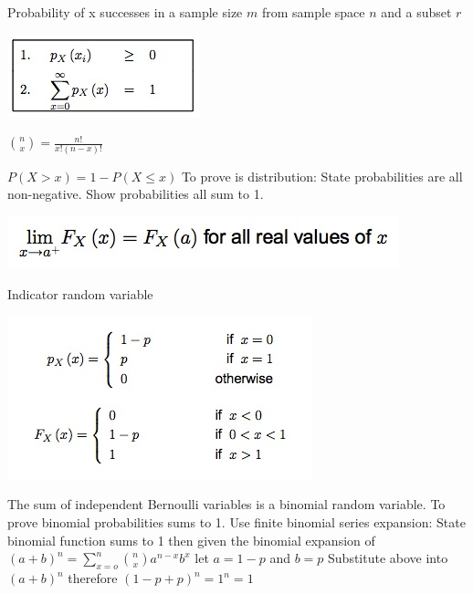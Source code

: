 \documentclass{/out/app/latex/examnotes}
\begin{document}
Probability of x successes in a sample size $m$ from sample space $n$ and a subset $r$  

\includegraphics[scale=0.8]{./img/2dis.jpg}

$\binom{n}{x} = \displaystyle\frac{n!}{x!(n-x)!}$

\vspace{6pt}
\ra $P(X>x)=1-P(X\le x)$
\vspace{6pt}
\ra To prove is distribution: 
 State probabilities are all non-negative.
 Show probabilities all sum to 1.
 
\includegraphics[scale=0.5]{./img/2contright.jpg}


\vspace{6pt}

\disobeylines
Indicator random variable  %
\obeylines

\includegraphics[scale=0.5]{./img/2ber.jpg}


\ra The sum of independent Bernoulli variables is a binomial random variable. 
\ra To prove binomial probabilities sums to 1. Use finite binomial series expansion:
 State binomial function sums to 1
 then given the binomial expansion of $(a+b)^n=\sum_{x=o}^n \binom{n}{x} a^{n-x}b^x$
 let $a=1-p$  and $b=p$
 Substitute above into $(a+b)^n$
 therefore $(1-p+p)^n=1^n=1$
\end{document}
